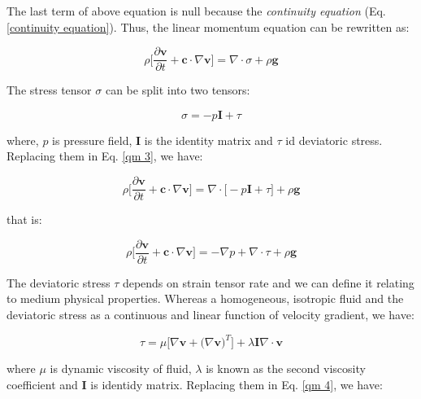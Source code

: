 \medskip
The last term of above equation is null because
 the \textit{continuity equation} (Eq. \ref{continuity equation}).
Thus, the linear momentum equation can be rewritten as:

\begin{equation} \label{qm 3}
 \rho \Bigg[ \frac{\partial \textbf{v}}{\partial t} + \textbf{c} \cdot \nabla \textbf{v} \Bigg]
 =
 \nabla \cdot \sigma
 +
 \rho \textbf{g}
\end{equation}

\medskip
\noindent
The stress tensor $\sigma$ can be split into
two tensors:

\begin{equation}
 \sigma = -p \textbf{I} + \tau
\end{equation}

\medskip
\noindent
where, $p$ is pressure field, \textbf{I} is the identity matrix and
$\tau$ id deviatoric stress. 
Replacing them in Eq. \ref{qm 3}, we have:

\begin{equation}
 \rho \Bigg[ \frac{\partial \textbf{v}}{\partial t} + \textbf{c} \cdot \nabla \textbf{v} \Bigg]
 =
 \nabla \cdot \big[ -p \textbf{I} + \tau \big]
 +
 \rho \textbf{g}
\end{equation}

\medskip
\noindent
that is:

\begin{equation} \label{qm 4}
 \rho \Bigg[ \frac{\partial \textbf{v}}{\partial t} + \textbf{c} \cdot \nabla \textbf{v} \Bigg]
 =
 -
 \nabla p
 +
 \nabla \cdot \tau
 +
 \rho \textbf{g}
\end{equation}

\medskip
The deviatoric stress $\tau$ depends on strain tensor rate and
we can define it relating to medium physical properties.
Whereas a homogeneous, isotropic fluid and the deviatoric stress
as a continuous and linear function of velocity gradient,
we have:

\begin{equation}
 \tau = \mu \big[ \nabla \textbf{v} + \big( \nabla \textbf{v} \big)^{T} \big]
      + \lambda \textbf{I} \nabla \cdot \textbf{v}
\end{equation}

\medskip
\noindent
where $\mu$ is dynamic viscosity of fluid,
$\lambda$ is known as the second viscosity coefficient and
\textbf{I} is identidy matrix.
Replacing them in Eq. \ref{qm 4}, we have:



